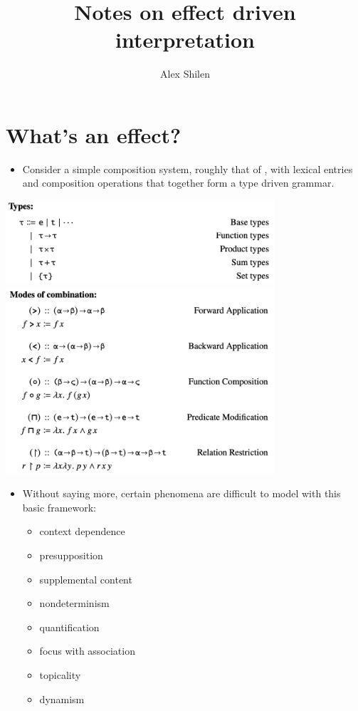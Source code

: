 \documentclass{article}
\title{Notes on effect driven interpretation}
\author{Alex Shilen}
\begin{document}
\maketitle

\thispagestyle{empty}

\section{What's an effect?}

\begin{itemize}
  \item Consider a simple composition system, roughly that of \cite{HeimKratzer1998}, with lexical entries
    and composition operations that together form a type driven grammar.
\end{itemize}

\begin{center}
  \includegraphics[width=10cm]{clips/1.png}
  \includegraphics[width=10cm]{clips/2.png}
\end{center}

\begin{itemize}
  \item Without saying more, certain phenomena are difficult to model with this basic framework:
  \begin{exe}
    \ex \label{phenomena}
    \begin{itemize}
      \item context dependence
      \item presupposition
      \item supplemental content
      \item nondeterminism
      \item quantification
      \item focus with association
      \item topicality
      \item dynamism
    \end{itemize}
  \end{exe}
\end{itemize}
\end{document}
